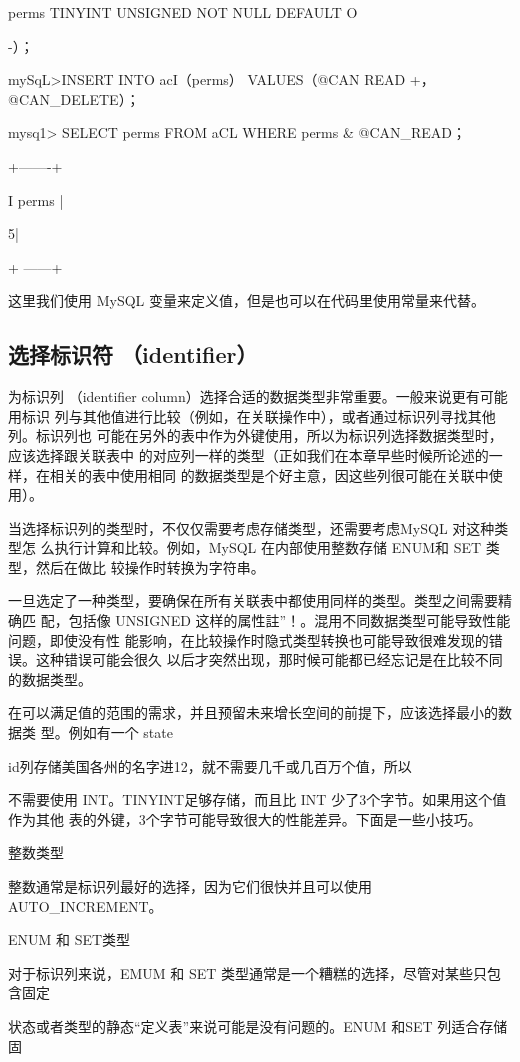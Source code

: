 perms TINYINT UNSIGNED NOT NULL DEFAULT O

-）；

mySqL>INSERT INTO acI（perms） VALUES（@CAN READ +， @CAN\_DELETE）；

mysq1> SELECT perms FROM aCL WHERE perms & @CAN\_READ；

+-------+

I perms |

5|

+ ------+

这里我们使用 MySQL 变量来定义值，但是也可以在代码里使用常量来代替。

\subsection{选择标识符 （identifier）}
为标识列 （identifier column）选择合适的数据类型非常重要。一般来说更有可能用标识
列与其他值进行比较（例如，在关联操作中），或者通过标识列寻找其他列。标识列也
可能在另外的表中作为外键使用，所以为标识列选择数据类型时，应该选择跟关联表中
的对应列一样的类型（正如我们在本章早些时候所论述的一样，在相关的表中使用相同
的数据类型是个好主意，因这些列很可能在关联中使用）。

当选择标识列的类型时，不仅仅需要考虑存储类型，还需要考虑MySQL 对这种类型怎
么执行计算和比较。例如，MySQL 在内部使用整数存储 ENUM和 SET 类型，然后在做比
较操作时转换为字符串。

一旦选定了一种类型，要确保在所有关联表中都使用同样的类型。类型之间需要精确匹
配，包括像 UNSIGNED 这样的属性註”！。混用不同数据类型可能导致性能问题，即使没有性
能影响，在比较操作时隐式类型转换也可能导致很难发现的错误。这种错误可能会很久
以后才突然出现，那时候可能都已经忘记是在比较不同的数据类型。

在可以满足值的范围的需求，并且预留未来增长空间的前提下，应该选择最小的数据类
型。例如有一个 state

id列存储美国各州的名字进12，就不需要几千或几百万个值，所以

不需要使用 INT。TINYINT足够存储，而且比 INT 少了3个字节。如果用这个值作为其他
表的外键，3个字节可能导致很大的性能差异。下面是一些小技巧。

整数类型

整数通常是标识列最好的选择，因为它们很快并且可以使用 AUTO\_INCREMENT。

ENUM 和 SET类型

对于标识列来说，EMUM 和 SET 类型通常是一个糟糕的选择，尽管对某些只包含固定

状态或者类型的静态“定义表”来说可能是没有问题的。ENUM 和SET 列适合存储固

